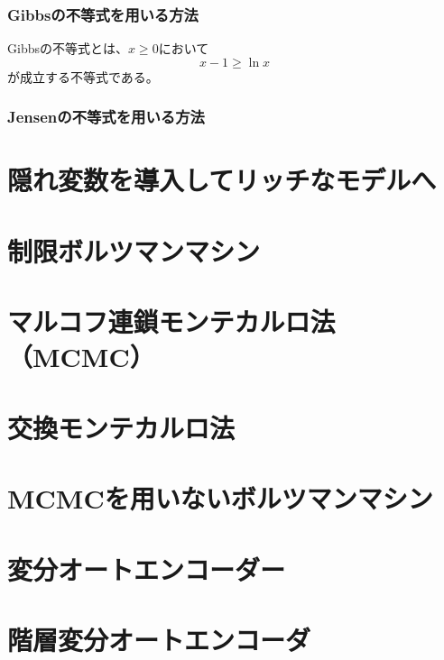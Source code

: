 \documentclass[a4paper,11pt,uplatex]{jsarticle}%
\begin{document}
\subsubsection*{Gibbsの不等式を用いる方法}
Gibbsの不等式とは、$x\geq 0$において
\begin{equation}
  x-1\geq \ln{x}
\end{equation}
が成立する不等式である。

\subsubsection*{Jensenの不等式を用いる方法}

\section{隠れ変数を導入してリッチなモデルへ}

\section{制限ボルツマンマシン}

\section{マルコフ連鎖モンテカルロ法（MCMC）}

\section{交換モンテカルロ法}

\section{MCMCを用いないボルツマンマシン}

\section{変分オートエンコーダー}

\section{階層変分オートエンコーダ}
\end{document}
